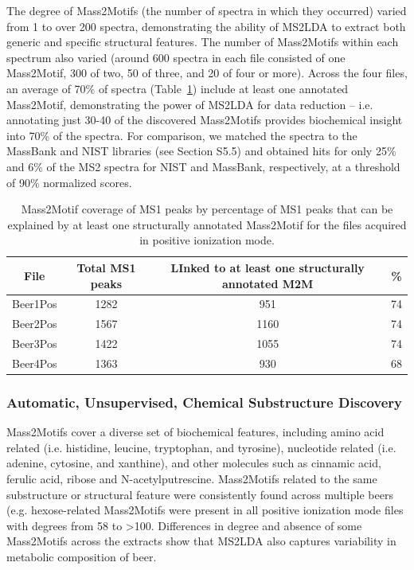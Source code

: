The degree of Mass2Motifs (the number of spectra in which they occurred) varied from 1 to over 200 spectra, demonstrating the ability of MS2LDA to extract both generic and specific structural features. The number of Mass2Motifs within each spectrum also varied (around 600 spectra in each file consisted of one Mass2Motif, 300 of two, 50 of three, and 20 of four or more). Across the four files, an average of 70\% of spectra (Table~\ref{tab:ms2lda-coverage}) include at least one annotated Mass2Motif, demonstrating the power of MS2LDA for data reduction – i.e. annotating just 30-40 of the discovered Mass2Motifs provides biochemical insight into 70\% of the spectra. For comparison, we matched the spectra to the MassBank and NIST libraries (see Section S5.5) and obtained hits for only 25\% and 6\% of the MS2 spectra for NIST and MassBank, respectively, at a threshold of 90\% normalized scores. 

\begin{table}
\begin{centering}
\begin{tabular}{|c|c|c|c|}
\hline 
File & Total MS1 peaks & LInked to at least one structurally annotated M2M & \%\tabularnewline
\hline 
\hline 
Beer1Pos & 1282 & 951 & 74\tabularnewline
\hline 
Beer2Pos & 1567 & 1160 & 74\tabularnewline
\hline 
Beer3Pos & 1422 & 1055 & 74\tabularnewline
\hline 
Beer4Pos & 1363 & 930 & 68\tabularnewline
\hline 
\end{tabular}
\par\end{centering}
\caption{Mass2Motif coverage of MS1 peaks by percentage of MS1 peaks that can
be explained by at least one structurally annotated Mass2Motif for
the files acquired in positive ionization mode.\label{tab:ms2lda-coverage}}
\end{table}

\subsubsection{Automatic, Unsupervised, Chemical Substructure Discovery}

Mass2Motifs cover a diverse set of biochemical features, including amino acid related (i.e. histidine, leucine, tryptophan, and tyrosine), nucleotide related (i.e. adenine, cytosine, and xanthine), and other molecules such as cinnamic acid, ferulic acid, ribose and N-acetylputrescine. Mass2Motifs related to the same substructure or structural feature were consistently found across multiple beers (e.g. hexose-related Mass2Motifs were present in all positive ionization mode files with degrees from 58 to >100. Differences in degree and absence of some Mass2Motifs across the extracts show that MS2LDA also captures variability in metabolic composition of beer.

